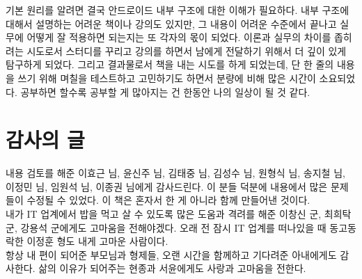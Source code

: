 \documentclass[a4paper,hidelinks,10pt,openany]{book} %
\begin{document}
기본 원리를 알려면 결국 안드로이드 내부 구조에 대한 이해가 필요하다.
내부 구조에 대해서 설명하는 어려운 책이나 강의도 있지만, 
그 내용이 어려운 수준에서 끝나고 실무에 어떻게 잘 적용하면 되는지는 또 각자의 몫이 되었다. 
이론과 실무의 차이를 좁히려는 시도로서 스터디를 꾸리고 강의를 하면서 
남에게 전달하기 위해서 더 깊이 있게 탐구하게 되었다.
그리고 결과물로서 책을 내는 시도를 하게 되었는데, 단 한 줄의 내용을 쓰기 위해 며칠을 테스트하고 고민하기도 하면서 분량에 비해 많은 시간이 소요되었다.
공부하면 할수록 공부할 게 많아지는 건 한동안 나의 일상이 될 것 같다.

\section{감사의 글}
내용 검토를 해준 이효근 님, 윤신주 님, 김태중 님, 김성수 님, 원형식 님, 송지철 님, 이정민 님, 임원석 님, 이종권 님에게 감사드린다. 
이 분들 덕분에 내용에서 많은 문제들이 수정될 수 있었다. 이 책은 혼자서 한 게 아니라 함께 만들어낸 것이다.\\

내가 IT 업계에서 밥을 먹고 살 수 있도록 많은 도움과 격려를 해준 이창신 군, 최희탁 군, 강용석 군에게도 고마움을 전해야겠다.
오래 전 잠시 IT 업계를 떠나있을 때 동고동락한 이정훈 형도 내게 고마운 사람이다.\\

항상 내 편이 되어준 부모님과 형제들, 
오랜 시간을 함께하고 기다려준 아내에게도 감사한다. 삶의 이유가 되어주는 현종과 서윤에게도 사랑과 고마움을 전한다.

\begin{comment}
필자는 회사에서 능력을 인정받거나 화려한 기술을 가진 것도 아닌 평범한 개발자이다. 
다만 문제를 겪고 해결할 때마다 메모하고 시간을 내서 내용을 정리한 것 뿐이다.
정리한 내용은 지력이 갈수록 떨어지는 필자를 위한 것이기도 하다.\\

나도 책과 인터넷에서 많은 도움을 받았다. 
오래 전 팀 동료가 그런 얘기를 했다. ``국내 IT서적은 다 쓰레기다'' 그 동료는 책 꽂이에 원서만 나열해놓고 있었다.
어쩌면 쓰레기 하나를 더 만들었는지도 모르겠다.

좌충우돌한 이야기

예민한 내용이 많아서 오류가 있을 수 있다. 혹시 오류라고 생각한다면 제보 바란다.

죄와벌 이나 태백산맥 같은 역작을 내는 것도 아닌데, 무슨 시간이 이리 많이 걸리는지..
\end{comment}

\tableofcontents
\end{document}
